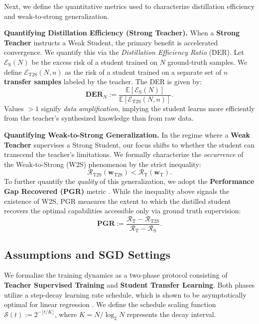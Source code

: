 \documentclass{article}
\theoremstyle{definition}
\theoremstyle{definition}
\theoremstyle{plain}
\theoremstyle{plain}
\theoremstyle{plain}
\theoremstyle{plain}
\theoremstyle{plain}
\newcommand{\te}{\mathrm{T}}
\newcommand{\st}{\mathrm{S}}
\newcommand{\ts}{\mathrm{T2S}}
\begin{document}
Next, we define the quantitative metrics used to characterize distillation efficiency and weak-to-strong generalization.

\textbf{Quantifying Distillation Efficiency (Strong Teacher).}
When a \textbf{Strong Teacher} instructs a Weak Student, the primary benefit is accelerated convergence. We quantify this via the \textit{Distillation Efficiency Ratio} (DER). Let $\mathcal{E}_{\st}(N)$ be the excess risk of a student trained on $N$ ground-truth samples. We define $\mathcal{E}_{\mathrm{T2S}}(N, n)$ as the risk of a student trained on a separate set of \textbf{$n$ transfer samples} labeled by the teacher. The DER is given by:
\begin{equation}
    \mathbf{DER}_N := \frac{\mathbb{E}[\mathcal{E}_{\st}(N)]}{\mathbb{E}[\mathcal{E}_{\mathrm{T2S}}(N, n)]}.
\end{equation}
Values $> 1$ signify \textit{data amplification}, implying the student learns more efficiently from the teacher's synthesized knowledge than from raw data.


\textbf{Quantifying Weak-to-Strong Generalization.}
In the regime where a \textbf{Weak Teacher} supervises a Strong Student, our focus shifts to whether the student can transcend the teacher's limitations. We formally characterize the \textit{occurrence} of the Weak-to-Strong (W2S) phenomenon by the strict inequality:
\begin{equation}
    \mathcal{R}_{\mathrm{T2S}}(\mathbf{w}_\ts) < \mathcal{R}_\te(\mathbf{w}_\te).
\end{equation}
To further quantify the \textit{quality} of this generalization, we adopt the \textbf{Performance Gap Recovered (PGR)} metric \citep{Burns2023WeaktoStrongGE}. While the inequality above signals the existence of W2S, PGR measures the extent to which the distilled student recovers the optimal capabilities accessible only via ground truth supervision:
\begin{equation}
    \mathbf{PGR} := \frac{\mathcal{R}_\te - \mathcal{R}_{\mathrm{T2S}}}{\mathcal{R}_\te - \mathcal{R}_\st}.
\end{equation}




\subsection{Assumptions and SGD Settings}
We formalize the training dynamics as a two-phase protocol consisting of \textbf{Teacher Supervised Training} and \textbf{Student Transfer Learning}. Both phases utilize a step-decay learning rate schedule, which is shown to be asymptotically optimal for linear regression \citep{ge2019step}. We define the schedule scaling function $\mathcal{S}(t) := 2^{-\lfloor t/K \rfloor}$, where $K = N/\log_2 N$ represents the decay interval.
\end{document}
